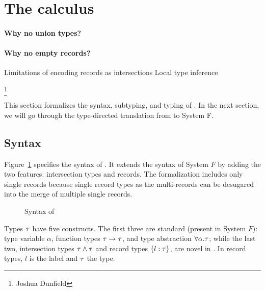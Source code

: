 \section{The \name calculus}

\paragraph{Why no union types?}

\paragraph{Why no empty records?}

Limitations of encoding records as intersections
Local type inference


\footnote{Joshua Dunfield}

This section formalizes the syntax, subtyping, and typing of \name. In the next
section, we will go through the type-directed translation from \name to System
F.


\subsection{Syntax}

Figure~\ref{fig:fi-syntax} specifies the syntax of \name. It extends the syntax
of System $ F $ by adding the two features: intersection types and
records. The
formalization includes only single records because single record types as the
multi-records can be desugared into the merge of multiple single records.

\begin{figure}
  
  \caption{Syntax of \name}
  \label{fig:fi-syntax}
\end{figure}

Types $ \tau $ have five constructs. The first three are standard (present in
System $ F $): type variable $ \alpha $, function types $ \tau \to \tau $, and type
abstraction $ \forall \alpha. \tau $; while the last two, intersection types
$ \tau \wedge \tau $ and record types $ \{ l : \tau \} $, are novel in \name. In
record types, $ l $ is the label and $ \tau $ the type.

